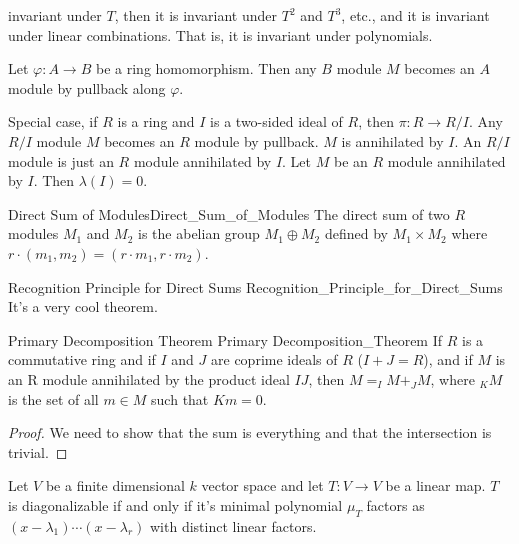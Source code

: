 \documentclass[crop=false,class=article]{standalone}                       %
\begin{document}
        invariant under $T$, then it is invariant under $T^{2}$ and
        $T^{3}$, etc., and
        it is invariant under linear combinations. That is, it is invariant
        under polynomials.
        \begin{example}
            Let $\varphi:A\rightarrow{B}$ be a ring homomorphism. Then any
            $B$ module $M$ becomes an $A$ module by pullback along $\varphi$.
        \end{example}
        Special case, if $R$ is a ring and $I$ is a two-sided ideal of $R$,
        then $\pi:R\rightarrow{R}/I$. Any $R/I$ module $M$ becomes an
        $R$ module by pullback. $M$ is annihilated by $I$. An $R/I$ module is
        just an $R$ module annihilated by $I$. Let $M$ be an $R$ module
        annihilated by $I$. Then $\lambda(I)=0$.
        \begin{ldefinition}{Direct Sum of Modules}{Direct_Sum_of_Modules}
            The direct sum of two $R$ modules $M_{1}$ and $M_{2}$ is
            the abelian group $M_{1}\oplus{M}_{2}$ defined by
            $M_{1}\times{M}_{2}$ where
            $r\cdot(m_{1},m_{2})=(r\cdot{m_{1}},r\cdot{m_{2}})$.
        \end{ldefinition}
        \begin{ltheorem}{Recognition Principle for Direct Sums}
                        {Recognition_Principle_for_Direct_Sums}
            It's a very cool theorem.
        \end{ltheorem}
        \begin{ltheorem}{Primary Decomposition Theorem}
                        {Primary Decomposition_Theorem}
            If $R$ is a commutative ring and if $I$ and $J$ are coprime ideals
            of $R$ ($I+J=R$), and if $M$ is an R module annihilated by the
            product ideal $IJ$, then $M=_{I}M+_{J}M$, where
            $_{K}M$ is the set of all $m\in{M}$ such that $Km=0$.
        \end{ltheorem}
        \begin{proof}
            We need to show that the sum is everything and that the intersection
            is trivial.
        \end{proof}
        Let $V$ be a finite dimensional $k$ vector space and let
        $T:V\rightarrow{V}$ be a linear map. $T$ is diagonalizable if and only
        if it's minimal polynomial $\mu_{T}$ factors as
        $(x-\lambda_{1})\cdots(x-\lambda_{r})$ with distinct linear factors.
\end{document}
